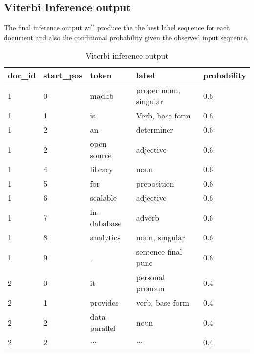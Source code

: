\subsection{Viterbi Inference output}
The final inference output will produce the the best label sequence for each document and also the conditional probability given the
observed input sequence.
\begin {table}[h]
\caption {Viterbi inference output}
\begin{center}
    \scriptsize
    \begin{tabular}{ | l | l | l | l | l | }
    \hline
    doc\_id & start\_pos & token & label & probability     \\\hline
    1   & 0    & madlib        & proper noun, singular &0.6\\
    1   & 1    & is            & Verb, base form       &0.6 \\
    1   & 2    & an            & determiner            &0.6 \\
    1   & 2    & open-source   & adjective             &0.6 \\
    1   & 4    & library       & noun                  &0.6 \\
    1   & 5    & for           & preposition           &0.6 \\
    1   & 6    & scalable      & adjective             &0.6 \\
    1   & 7    & in-dababase   & adverb                &0.6 \\
    1   & 8    & analytics     & noun, singular        &0.6 \\
    1   & 9    & .             & sentence-final punc   &0.6 \\
    2   & 0    & it            & personal pronoun      &0.4 \\
    2   & 1    & provides      & verb, base form       &0.4 \\
    2   & 2    & data-parallel & noun                  &0.4 \\
    2   & 2    & $\ldots$      & $\ldots$                    &0.4 \\
    \hline
    \end{tabular}
\end{center}
\end{table}
